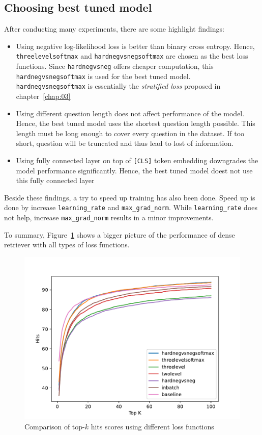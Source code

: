 \documentclass[12pt, sort&compress]{report}
\begin{document}
\subsection{Choosing best tuned model}
\label{sec:4.4.4}
After conducting many experiments, there are some highlight findings:
\begin{itemize}
	\item Using negative log-likelihood loss is better than binary cross entropy. Hence, {\tt threelevelsoftmax} and {\tt hardnegvsnegsoftmax} are chosen as the best loss functions. Since {\tt hardnegvsneg} offers cheaper computation, this {\tt hardnegvsnegsoftmax} is used for the best tuned model. {\tt hardnegvsnegsoftmax} is essentially the \textit{stratified loss} proposed in chapter~\ref{chap:03}
	\item Using different question length does not affect performance of the model. Hence, the best tuned model uses the shortest question length possible. This length must be long enough to cover every question in the dataset. If too short, question will be truncated and thus lead to lost of information.
	\item Using fully connected layer on top of {\tt [CLS]} token embedding downgrades the model performance significantly. Hence, the best tuned model doest not use this fully connected layer 
\end{itemize}
\par Beside these findings, a try to speed up training has also been done. Speed up is done by increase {\tt learning\_rate} and {\tt max\_grad\_norm}. While {\tt learning\_rate} does not help, increase {\tt max\_grad\_norm} results in a minor improvements.
\par To summary, Figure~\ref{fig:21} shows a bigger picture of the performance of dense retriever with all types of loss functions.
\begin{figure}
	\centering
	\includegraphics[scale=.7]{images/PDF/experiments/K_hits.pdf}
	\caption{Comparison of top-$k$ hits scores using different loss functions}
	\label{fig:21}
\end{figure}
\end{document}
